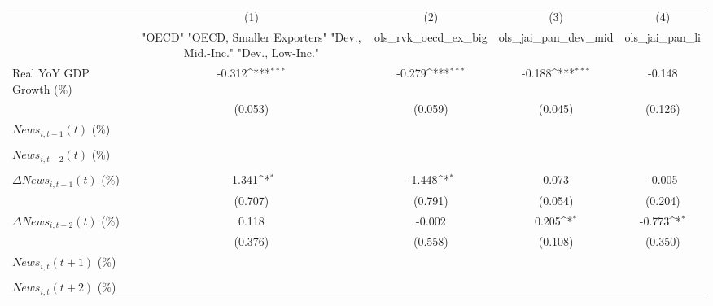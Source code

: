 {
\def\sym#1{\ifmmode^{#1}\else\(^{#1}\)\fi}
\begin{tabular}{l*{4}{c}}
\toprule
                    &\multicolumn{1}{c}{(1)}&\multicolumn{1}{c}{(2)}&\multicolumn{1}{c}{(3)}&\multicolumn{1}{c}{(4)}\\
                    &\multicolumn{1}{c}{ "OECD" "OECD, Smaller Exporters" "Dev., Mid.-Inc." "Dev., Low-Inc."}&\multicolumn{1}{c}{ols_rvk_oecd_ex_big}&\multicolumn{1}{c}{ols_jai_pan_dev_mid}&\multicolumn{1}{c}{ols_jai_pan_li}\\
\midrule
Real YoY GDP Growth (\%)&      -0.312\sym{***}&      -0.279\sym{***}&      -0.188\sym{***}&      -0.148         \\
                    &     (0.053)         &     (0.059)         &     (0.045)         &     (0.126)         \\
\addlinespace
$ News_{i,t-1}(t)$ (\%)&                     &                     &                     &                     \\
                    &                     &                     &                     &                     \\
\addlinespace
$ News_{i,t-2}(t)$ (\%)&                     &                     &                     &                     \\
                    &                     &                     &                     &                     \\
\addlinespace
$ \Delta News_{i,t-1}(t)$ (\%)&      -1.341\sym{*}  &      -1.448\sym{*}  &       0.073         &      -0.005         \\
                    &     (0.707)         &     (0.791)         &     (0.054)         &     (0.204)         \\
\addlinespace
$ \Delta News_{i,t-2}(t)$ (\%)&       0.118         &      -0.002         &       0.205\sym{*}  &      -0.773\sym{*}  \\
                    &     (0.376)         &     (0.558)         &     (0.108)         &     (0.350)         \\
\addlinespace
$ News_{i,t}(t+1)$ (\%)&                     &                     &                     &                     \\
                    &                     &                     &                     &                     \\
\addlinespace
$ News_{i,t}(t+2)$ (\%)&                     &                     &                     &                     \\

\end{tabular}}
